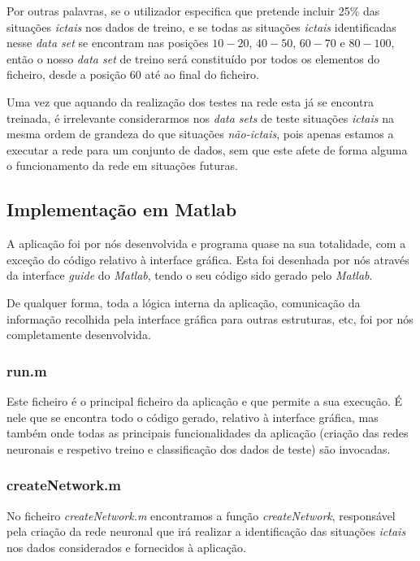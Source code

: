 \documentclass{article}
\begin{document}
Por outras palavras, se o utilizador especifica que pretende incluir 25\% das situações \emph{ictais} nos dados de treino, e se todas as situações \emph{ictais} identificadas nesse \emph{data set} se encontram nas posições $10-20$, $40-50$, $60-70$ e $80-100$, então o nosso \emph{data set} de treino será constituído por todos os elementos do ficheiro, desde a posição $60$ até ao final do ficheiro.

Uma vez que aquando da realização dos testes na rede esta já se encontra treinada, é irrelevante considerarmos nos \emph{data sets} de teste situações \emph{ictais} na mesma ordem de grandeza do que situações \emph{não-ictais}, pois apenas estamos a executar a rede para um conjunto de dados, sem que este afete de forma alguma o funcionamento da rede em situações futuras.

\subsection{Implementação em Matlab}

A aplicação foi por nós desenvolvida e programa quase na sua totalidade, com a exceção do código relativo à interface gráfica. Esta foi desenhada por nós através da interface \emph{guide} do \emph{Matlab}, tendo o seu código sido gerado pelo \emph{Matlab}.

De qualquer forma, toda a lógica interna da aplicação, comunicação da informação recolhida pela interface gráfica para outras estruturas, etc, foi por nós completamente desenvolvida.

\subsubsection{run.m}

Este ficheiro é o principal ficheiro da aplicação e que permite a sua execução. É nele que se encontra todo o código gerado, relativo à interface gráfica, mas também onde todas as principais funcionalidades da aplicação (criação das redes neuronais e respetivo treino e classificação dos dados de teste) são invocadas.

\subsubsection{createNetwork.m}

No ficheiro \emph{createNetwork.m} encontramos a função \emph{createNetwork}, responsável pela criação da rede neuronal que irá realizar a identificação das  situações \emph{ictais} nos dados considerados e fornecidos à aplicação. 
\end{document}
